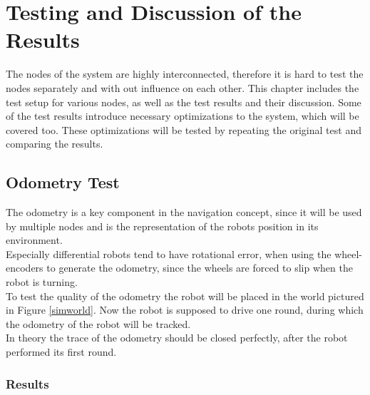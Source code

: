 \chapter{Testing and Discussion of the Results}
\label{resultanddiscussion}

The nodes of the system are highly interconnected, therefore it is hard to test the nodes separately and with out influence on each other. This chapter includes the test setup for various nodes, as well as the test results and their discussion. Some of the test results introduce necessary optimizations to the system, which will be covered too. These optimizations will be tested by repeating the original test and comparing the results.

\section{Odometry Test}

The odometry is a key component in the navigation concept, since it will be used by multiple nodes and is the representation of the robots position in its environment.\\

Especially differential robots tend to have rotational error, when using the wheel-encoders to generate the odometry, since the wheels are forced to slip when the robot is turning.\\

To test the quality of the odometry the robot will be placed in the world pictured in Figure \ref{simworld}. Now the robot is supposed to drive one round, during which the odometry of the robot will be tracked.\\

In theory the trace of the odometry should be closed perfectly, after the robot performed its first round.\\

\subsection{Results}

